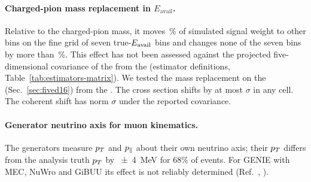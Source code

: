 \paragraph{Charged-pion mass replacement in $E_{\mathrm{avail}}$.} Relative to the charged-pion mass, it moves \,\% of simulated signal weight to other bins on the fine grid of seven true-$E_{\mathrm{avail}}$ bins and changes none of the seven bins by more than \,\%. This effect has not been assessed against the projected five-dimensional covariance of the \resFiveAxis{} from the \estPurity{} (estimator definitions, Table~\ref{tab:estimators-matrix}). We tested the mass replacement on the \resSixteen{} (Sec.~\ref{sec:fived16}) from the \estMultiD{}. The cross section shifts by at most $\sigma$ in any cell. The coherent shift has norm $\sigma$ under the reported covariance.

\paragraph{Generator neutrino axis for muon kinematics.} The generators measure $p_{T}$ and $p_{\parallel}$ about their own neutrino axis; their $p_{T}$ differs from the analysis truth $p_{T}$ by \SI{\pm4}{MeV} for 68\% of events. For GENIE with MEC, NuWro and GiBUU its effect is not reliably determined (Ref.~\cite{NoteRecords2026}, ).

